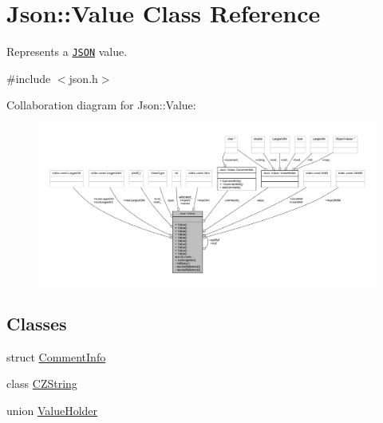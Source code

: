 \hypertarget{class_json_1_1_value}{}\section{Json\+:\+:Value Class Reference}
\label{class_json_1_1_value}


Represents a \href{http://www.json.org}{\tt J\+S\+ON} value.  




{\ttfamily \#include $<$json.\+h$>$}



Collaboration diagram for Json\+:\+:Value\+:\nopagebreak
\begin{figure}[H]
\begin{center}
\leavevmode
\includegraphics[width=350pt]{class_json_1_1_value__coll__graph}
\end{center}
\end{figure}
\subsection*{Classes}
\begin{DoxyCompactItemize}
\item 
struct \hyperlink{struct_json_1_1_value_1_1_comment_info}{Comment\+Info}
\item 
class \hyperlink{class_json_1_1_value_1_1_c_z_string}{C\+Z\+String}
\item 
union \hyperlink{union_json_1_1_value_1_1_value_holder}{Value\+Holder}
\end{DoxyCompactItemize}
